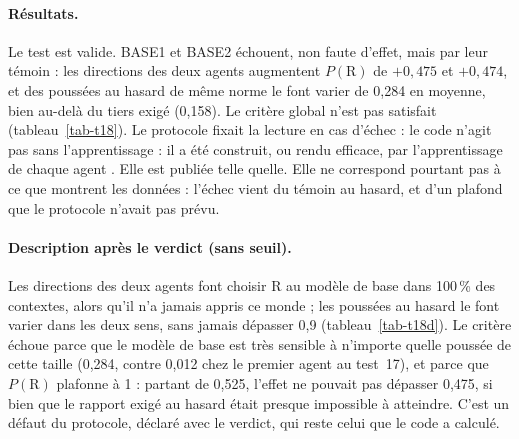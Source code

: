 \documentclass[11pt,a4paper]{article}
\begin{document}
\paragraph{Résultats.} Le test est valide. BASE1 et BASE2 échouent, non faute d'effet, mais
par leur témoin : les directions des deux agents augmentent $P(\mathrm R)$ de $+0,475$ et
$+0,474$, et des poussées au hasard de même norme le font varier de 0,284 en moyenne, bien
au-delà du tiers exigé (0,158). Le critère global n'est pas satisfait
(tableau~\ref{tab-t18}). Le protocole fixait la lecture en cas d'échec : \og le code n'agit
pas sans l'apprentissage : il a été construit, ou rendu efficace, par l'apprentissage de chaque
agent \fg{}. Elle est publiée telle quelle. Elle ne correspond pourtant pas à ce que montrent
les données : l'échec vient du témoin au hasard, et d'un plafond que le protocole n'avait pas
prévu.

\paragraph{Description après le verdict (sans seuil).} Les directions des deux agents font
choisir R au modèle de base dans 100\,\% des contextes, alors qu'il n'a jamais appris ce
monde ; les poussées au hasard le font varier dans les deux sens, sans jamais dépasser 0,9
(tableau~\ref{tab-t18d}). Le critère échoue parce que le modèle de base est très sensible à
n'importe quelle poussée de cette taille (0,284, contre 0,012 chez le premier agent au
test~17), et parce que $P(\mathrm R)$ plafonne à 1 : partant de 0,525, l'effet ne pouvait pas
dépasser 0,475, si bien que le rapport exigé au hasard était presque impossible à atteindre.
C'est un défaut du protocole, déclaré avec le verdict, qui reste celui que le code a calculé.
\end{document}
